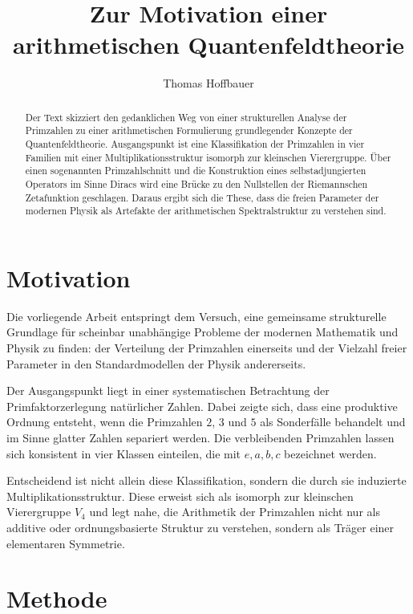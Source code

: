 \documentclass[11pt,a4paper]{article}
\title{Zur Motivation einer arithmetischen Quantenfeldtheorie}
\author{Thomas Hoffbauer}
\date{}
\begin{document}
	\maketitle
	
	\begin{abstract}
		Der Text skizziert den gedanklichen Weg von einer strukturellen Analyse der
		Primzahlen zu einer arithmetischen Formulierung grundlegender Konzepte der
		Quantenfeldtheorie. Ausgangspunkt ist eine Klassifikation der Primzahlen in
		vier Familien mit einer Multiplikationsstruktur isomorph zur kleinschen
		Vierergruppe. Über einen sogenannten Primzahlschnitt und die Konstruktion
		eines selbstadjungierten Operators im Sinne Diracs wird eine Brücke zu den
		Nullstellen der Riemannschen Zetafunktion geschlagen. Daraus ergibt sich die
		These, dass die freien Parameter der modernen Physik als Artefakte der
		arithmetischen Spektralstruktur zu verstehen sind.
	\end{abstract}
	
	\section{Motivation}
	
	Die vorliegende Arbeit entspringt dem Versuch, eine gemeinsame strukturelle
	Grundlage für scheinbar unabhängige Probleme der modernen Mathematik und
	Physik zu finden: der Verteilung der Primzahlen einerseits und der Vielzahl
	freier Parameter in den Standardmodellen der Physik andererseits.
	
	Der Ausgangspunkt liegt in einer systematischen Betrachtung der
	Primfaktorzerlegung natürlicher Zahlen. Dabei zeigte sich, dass eine
	produktive Ordnung entsteht, wenn die Primzahlen \(2\), \(3\) und \(5\) als
	Sonderfälle behandelt und im Sinne glatter Zahlen separiert werden. Die
	verbleibenden Primzahlen lassen sich konsistent in vier Klassen einteilen, die
	mit \(e,a,b,c\) bezeichnet werden.
	
	Entscheidend ist nicht allein diese Klassifikation, sondern die durch sie
	induzierte Multiplikationsstruktur. Diese erweist sich als isomorph zur
	kleinschen Vierergruppe \(V_4\) und legt nahe, die Arithmetik der Primzahlen
	nicht nur als additive oder ordnungsbasierte Struktur zu verstehen, sondern
	als Träger einer elementaren Symmetrie.
	
	\section{Methode}
	
\end{document}

